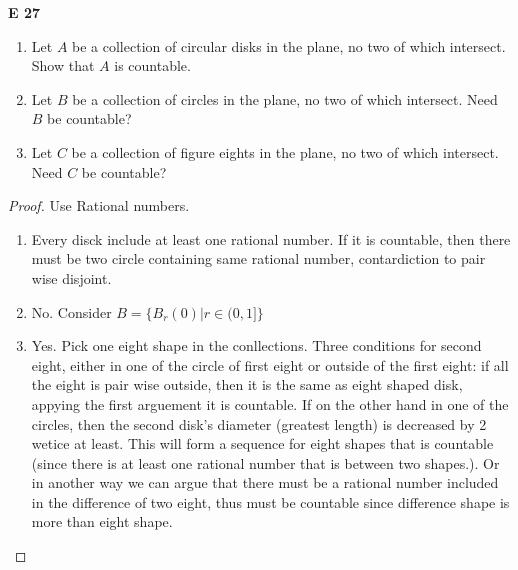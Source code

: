 \begin{question}
    \textbf{E 27} 
    \begin{enumerate}
        \item Let \( A \) be a collection of circular disks in the plane, no two of which intersect. Show that \( A \) is countable.
        \item Let \( B \) be a collection of circles in the plane, no two of which intersect. Need \( B \) be countable?
        \item Let \( C \) be a collection of figure eights in the plane, no two of which intersect. Need \( C \) be countable?
    \end{enumerate}
\end{question}
\begin{proof} Use Rational numbers.
    \begin{enumerate}
        \item Every disck include at least one rational number. If it is countable, then there must be two circle containing same rational number, contardiction to pair wise disjoint.
        \item No. Consider \(B = \{B_r(0) | r \in (0, 1]\}\)
        \item Yes. Pick one eight shape in the conllections. Three conditions for second eight, either in one of the circle of first eight or outside of the first eight: if all the eight is pair wise outside, then it is the same as eight shaped disk, appying the first arguement it is countable. If on the other hand in one of the circles, then the second disk's diameter (greatest length) is decreased by 2 wetice at least. This will form a sequence for eight shapes that is countable (since there is at least one rational number that is between two shapes.). Or in another way we can argue that there must be a rational number included in the difference of two eight, thus must be countable since difference shape is more than eight shape.
    \end{enumerate}
\end{proof}